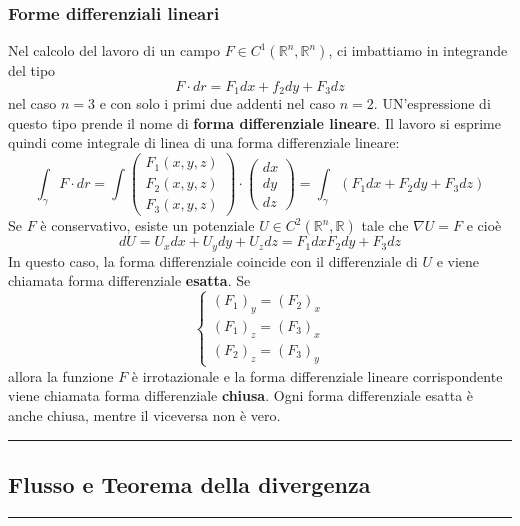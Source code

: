 \subsubsection{Forme differenziali lineari}
Nel calcolo del lavoro di un campo $F \in C^1 (\mathbb{R}^n, \mathbb{R}^n)$, ci imbattiamo in integrande del tipo
\[
    F \cdot  dr = F_1 dx + f_2 dy + F_3 dz
\]
nel caso $n=3$ e con solo i primi due addenti nel caso $n=2$. UN'espressione di questo tipo prende il nome di \textbf{forma differenziale lineare}. Il lavoro si esprime quindi come integrale di linea di una forma differenziale lineare:
\[
    \int_\gamma F \cdot dr = \int\left(\begin{matrix}
        F_1(x,y,z)\\
        F_2(x,y,z)\\
        F_3(x,y,z)
    \end{matrix}\right) \cdot \left(\begin{matrix}
        dx\\dy\\dz
    \end{matrix}\right) = \int_\gamma (F_1 dx + F_2 dy + F_3 dz)
\] 
\newline
Se $F$ è conservativo, esiste un potenziale $U \in C^2(\mathbb{R}^n, \mathbb{R})$ tale che $\nabla U = F$ e cioè
\[
    dU = U_x dx + U_y dy + U_z dz = F_1 dx F_2 dy + F_3 dz
\]
In questo caso, la forma differenziale coincide con il differenziale di $U$ e viene chiamata forma differenziale \textbf{esatta}.\newline
\newline
Se 
\[
    \begin{cases}
        (F_1)_y =(F_2)_x\\
        (F_1)_z =(F_3)_x\\
        (F_2)_z =(F_3)_y
    \end{cases}
\]
allora la funzione $F$ è irrotazionale e la forma differenziale lineare corrispondente viene chiamata forma differenziale \textbf{chiusa}.\newline
\newline
Ogni forma differenziale esatta è anche chiusa, mentre il viceversa non è vero.\newline
\rule{\textwidth}{2pt}
\subsection{Flusso e Teorema della divergenza}
\rule{\textwidth}{0,4pt}

